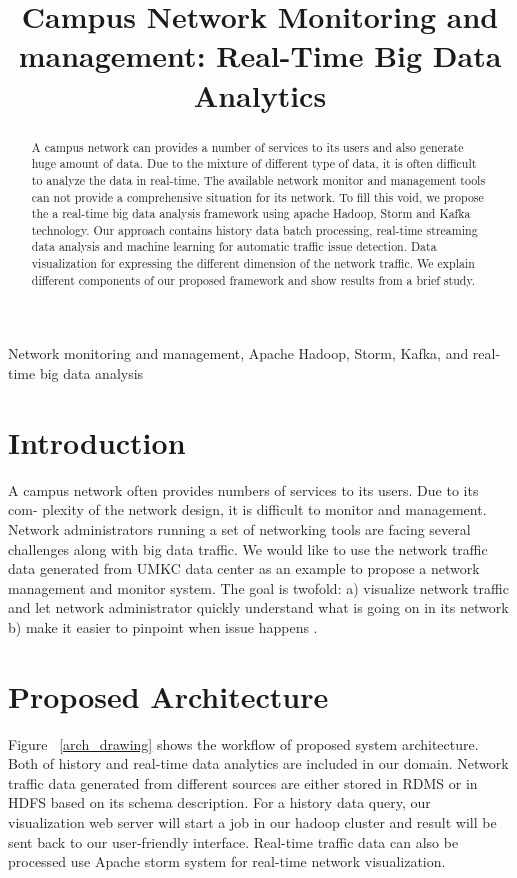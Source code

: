 \documentclass[conference]{IEEEtran}
\title{Campus Network Monitoring and management: Real-Time Big Data Analytics}
\author{
\IEEEauthorblockN{ Shuai Zhao\dag, Mayanka Chandra Shekar\dag, Yugyung  Lee\dag}

\IEEEauthorblockN{\dag University of Missouri-Kansas City, MO, USA. \{Shuai.Zhao, mckw9, LeeYu\}@mail.umkc.edu}
}
\begin{document}
\maketitle
\begin{abstract}
A campus network can provides a number of services to its users and also generate huge amount of data. Due to the mixture of different type of data, it is often difficult to analyze the data in real-time. The available network monitor and management tools can not provide a comprehensive situation for its network. To fill this void, we propose the a real-time big data analysis framework using apache Hadoop, Storm and Kafka technology. Our approach contains history data batch processing, real-time streaming data analysis and machine learning for automatic traffic issue detection. Data visualization for expressing the different dimension of the network traffic. We explain different components of our proposed framework and show results from a brief study.

\end{abstract}

\begin{keywords}
Network monitoring and management, Apache Hadoop, Storm, Kafka, and real-time big data analysis
\end{keywords}

\section{Introduction} \label{sec:introduction}

A campus network often provides numbers of services to its users. Due to its com- plexity of the network design, it is difficult to monitor and management. Network administrators running a set of networking tools are facing several challenges along with big data traffic. We would like to use the network traffic data generated from UMKC data center as an example to propose a network management and monitor system. The goal is twofold: a) visualize network traffic and let network administrator quickly understand what is going on in its network b) make it easier to pinpoint when issue happens .

\section{Proposed Architecture} \label{sec:architecture}

Figure ~\ref{arch_drawing} shows the workflow of proposed system architecture. Both of history and real-time data analytics are included in our domain. Network traffic data generated from different sources are either stored in RDMS or in HDFS based on its schema description. For a history data query, our visualization web server will start a job in our hadoop cluster and result will be sent back to our user-friendly interface. Real-time traffic data can also be processed use Apache storm system for real-time network visualization. 
\end{document}
